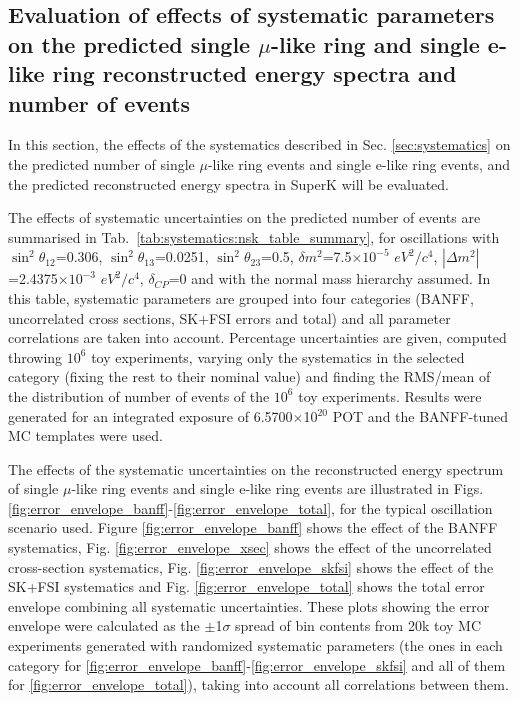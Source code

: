 \clearpage






\subsection {Evaluation of effects of systematic parameters on the predicted single $\mu$-like ring and single e-like ring reconstructed energy spectra and number of events}
\label{sec:systematics:evaluation}


In this section,  the effects of the systematics described in Sec. \ref{sec:systematics}
on the predicted number of single $\mu$-like ring events and single e-like ring events, 
and the predicted reconstructed energy spectra in SuperK will be evaluated. 

The effects of systematic uncertainties on the predicted number of events are summarised in Tab.\ \ref{tab:systematics:nsk_table_summary}, 
for oscillations with 
$\sin^{2}\theta_{12}$=0.306,	
 $\sin^{2}\theta_{13}$=0.0251,
 $\sin^{2}\theta_{23}$=0.5,
 $\delta m^{2}$=7.5$\times10^{-5}$ $eV^{2}/c^{4}$,
   $|\Delta m^{2}|$=2.4375$\times10^{-3}$ $eV^{2}/c^{4}$,
  $\delta_{CP}$=0 and 
  with the normal mass hierarchy assumed.
In this table, systematic parameters are grouped into four categories
(BANFF, uncorrelated cross sections, SK+FSI errors and total)
 and all parameter correlations are taken into account.
Percentage uncertainties are given,
computed throwing $10^{6}$ toy experiments, varying only the systematics in the selected category
(fixing the rest to their nominal value) and finding the RMS/mean of the distribution of number
of events of the $10^{6}$ toy experiments.
Results were generated for an integrated exposure of 6.5700$\times$10$^{20}$ POT and
the BANFF-tuned MC templates were used.


The effects of the systematic uncertainties on the reconstructed energy spectrum of single $\mu$-like ring events
and single e-like ring events are illustrated in Figs. \ref{fig:error_envelope_banff}-\ref{fig:error_envelope_total},
for the typical oscillation scenario used. Figure \ref{fig:error_envelope_banff} shows the effect of the BANFF systematics, Fig. \ref{fig:error_envelope_xsec} shows the effect of the uncorrelated cross-section systematics, Fig. \ref{fig:error_envelope_skfsi} shows the effect of the SK+FSI systematics and Fig. \ref{fig:error_envelope_total} shows the total error envelope combining all systematic uncertainties. These plots showing the error envelope were calculated as the $\pm$1$\sigma$ spread of bin contents from 20k toy MC experiments generated with randomized systematic parameters (the ones in each category for \ref{fig:error_envelope_banff}-\ref{fig:error_envelope_skfsi} and all of them for \ref{fig:error_envelope_total}), taking into account all correlations between them. 

